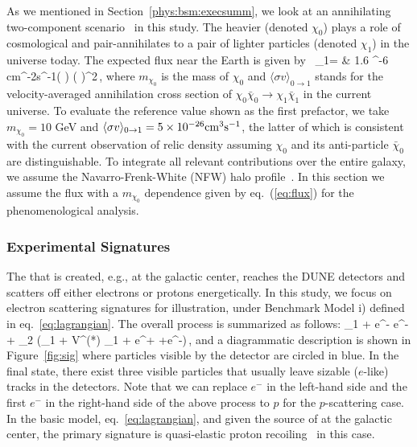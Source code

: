 As we mentioned in Section~\ref{phys:bsm:execsumm}, %
we look at an annihilating two-component  scenario~\cite{Belanger:2011ww} in this study. 
The heavier  (denoted $\chi_0$) plays a role of cosmological  and pair-annihilates to a pair of lighter  particles (denoted $\chi_1$) in the universe today. 
The expected flux near the Earth is given by~\cite{Agashe:2014yua,
Giudice:2017zke, Kim:2018veo}
\bea 
{}_1= & 1.6 ^{-6} {\rm cm}^{-2}{\rm s}^{-1}\times \left( \right) 
 \times \left( \right)^2\,,
\label{eq:flux}
\eea
where $m_{\chi_0}$ is the mass of $\chi_0$ and $\langle \sigma v\rangle_{0\rightarrow 1}$ stands for the velocity-averaged annihilation cross section of $\chi_0\bar{\chi}_0 \to \chi_1\bar{\chi}_1$ in the current universe.
To evaluate the reference value shown as the first prefactor, we take $m_{\chi_0} = 10$ GeV and $\langle \sigma v\rangle_{0\rightarrow 1}=5\times 10^{-26}{\rm cm}^3{\rm s}^{-1}$, the latter of which is consistent with the current observation of  relic density assuming $\chi_0$ and its anti-particle $\bar{\chi}_0$ are distinguishable. 
To integrate all relevant contributions over the entire galaxy, we assume the Navarro-Frenk-White (NFW)  halo profile~\cite{Navarro:1995iw, Navarro:1996gj}.
In this section we assume the  flux with a $m_{\chi_0}$ dependence given by eq.~(\ref{eq:flux}) for the phenomenological analysis. 


\subsubsection{Experimental Signatures}

The  that is created, e.g., at the galactic center, reaches the DUNE  
detectors and scatters off either electrons or protons energetically. 
In this study, we focus on electron scattering signatures for illustration, under Benchmark Model i) defined in eq.~\eqref{eq:lagrangian}. 
The overall process is summarized as follows:
\bea 
\chi_1 + e^- \to e^- + \chi_2 (\to \chi_1 + V^{(*)} \to \chi_1 + e^+ +e^-)\,,
\eea
and a diagrammatic description is shown in Figure~\ref{fig:sig} where %
particles visible by the detector are circled in blue. %
In the final state, there exist three visible particles that usually leave sizable ($e$-like) tracks in the %
detectors.  
Note that we can replace $e^-$ in the left-hand side and the first $e^-$ in the right-hand side of the above process to $p$ for the $p$-scattering case.
In the basic model, eq.~\eqref{eq:lagrangian}, and given the source of  at the galactic center,  the primary signature is quasi-elastic proton recoiling~\cite{pscattering} in this case.

